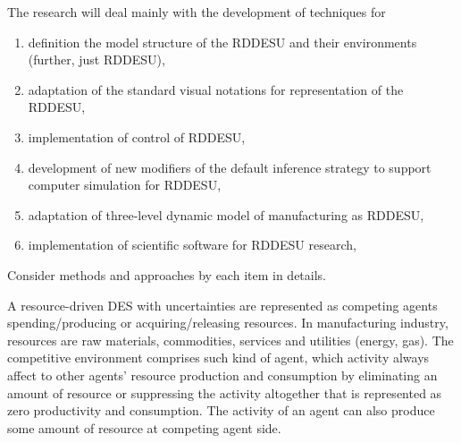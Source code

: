 \documentclass[runningheads]{llncs}
\begin{document}

The research will deal mainly with the development of techniques for
\begin{enumerate}
\item definition the model structure of the RDDESU and their environments (further, just RDDESU),
\item adaptation of the standard visual notations for representation of the RDDESU,
\item implementation of control of RDDESU,
\item development of new modifiers of the default inference strategy to support computer simulation for RDDESU,
\item adaptation of three-level dynamic model of manufacturing as RDDESU,
\item implementation of scientific software for RDDESU research,
\end{enumerate}

Consider methods and approaches by each item in details.

A resource-driven DES with uncertainties are represented as competing agents spending/producing or acquiring/releasing resources. In manufacturing industry, resources are raw materials, commodities, services and utilities (energy, gas). The competitive environment comprises such kind of agent, which activity always affect to other agents' resource production and consumption by eliminating an amount of resource or suppressing the activity altogether that is represented as zero productivity and consumption. The activity of an agent can also produce some amount of resource at competing agent side.
\end{document}

